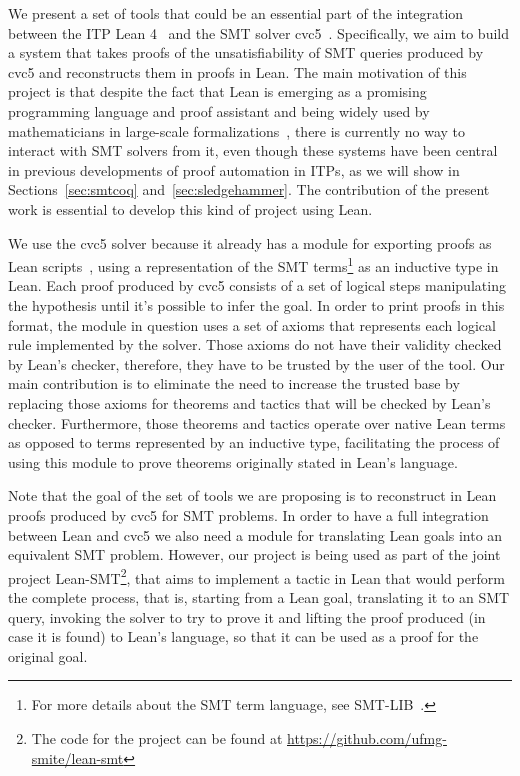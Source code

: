 We present a set of tools that could be an essential
part of the integration between the ITP Lean 4~\cite{lean} and the SMT solver cvc5~\cite{cvc5}.
%
Specifically, we aim to build a system that takes proofs of the unsatisfiability of
SMT queries produced by cvc5 and reconstructs them in proofs in Lean.
%
The main motivation of this project is that despite the fact that Lean is
emerging as a promising programming language and proof assistant and being
widely used by mathematicians in large-scale
formalizations~\cite{mathlib, scholze}, there is currently no way to
interact with SMT solvers from it, even though these systems have been
central in previous developments of proof automation in ITPs, as we will show in Sections~\ref{sec:smtcoq}
and~\ref{sec:sledgehammer}. The contribution of the present work
is essential to develop this kind of project using Lean.


We use the cvc5 solver because it already has a module for exporting proofs as
Lean scripts~\cite{Barbosa2022}, using a representation of the SMT terms\footnote{For more details
about the SMT term language, see SMT-LIB~\cite{smtlib}.} as an inductive type in Lean.
Each proof produced by cvc5 consists of a set of logical steps manipulating the hypothesis
until it's possible to infer the goal. In order to print proofs in this format, the module
in question uses a set of axioms that represents each logical rule implemented by the solver.
Those axioms do not have their validity checked by Lean's checker, therefore, they have to
be trusted by the user of the tool.
Our main contribution is to eliminate the need to increase the trusted base by replacing
those axioms for theorems and tactics that will be checked by Lean's checker. Furthermore,
those theorems and tactics operate over native Lean terms as opposed to terms represented by an inductive type,
facilitating the process of using this module to prove theorems originally stated in Lean's language.

Note that the goal of the set of tools we are proposing is to reconstruct in Lean proofs produced by
cvc5 for SMT problems. In order to have a full integration between Lean and cvc5 we also
need a module for translating Lean goals into an equivalent SMT problem.
However, our project is being used
as part of the joint project Lean-SMT\footnote{The code for the project can be found at \url{https://github.com/ufmg-smite/lean-smt}}, that aims to implement a tactic in Lean
that would perform the complete process, that is, starting from a Lean goal, translating it to an SMT query, invoking the solver to try to prove it and lifting the proof produced (in case it is found) to Lean's language, so that it can be used as a proof for the original goal.
